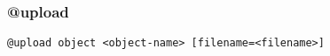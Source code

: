\subsubsection{@upload}
\label{upload}

\begin{verbatim}
@upload object <object-name> [filename=<filename>]
\end{verbatim}